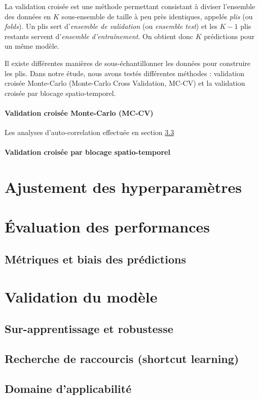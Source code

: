 			La validation croisée est une méthode permettant consistant à diviser l'ensemble des données en $K$ sous-ensemble de taille à peu près identiques, appelés \textit{plis} (ou \textit{folds}). Un plis sert d'\textit{ensemble de validation} (ou \textit{ensemble test}) et les $K-1$ plis restants servent d'\textit{ensemble d'entraînement}. On obtient donc $K$ prédictions pour un même modèle. 
			
			Il existe différentes manières de sous-échantillonner les données pour construire les plis. Dans notre étude, nous avons testés différentes méthodes : validation croisée Monte-Carlo (Monte-Carlo Cross Validation, MC-CV) et la validation croisée par blocage spatio-temporel.
			\paragraph{Validation croisée Monte-Carlo (MC-CV)}
				Les analyses d'auto-correlation effectuée en section \ref{}
			\paragraph{Validation croisée par blocage spatio-temporel}
			
	\section{Ajustement des hyperparamètres}
	\section{Évaluation des performances}
		\subsection{Métriques et biais des prédictions}
	\section{Validation du modèle}
		\subsection{Sur-apprentissage et robustesse}
		\subsection{Recherche de raccourcis (shortcut learning)}
		\subsection{Domaine d'applicabilité}
